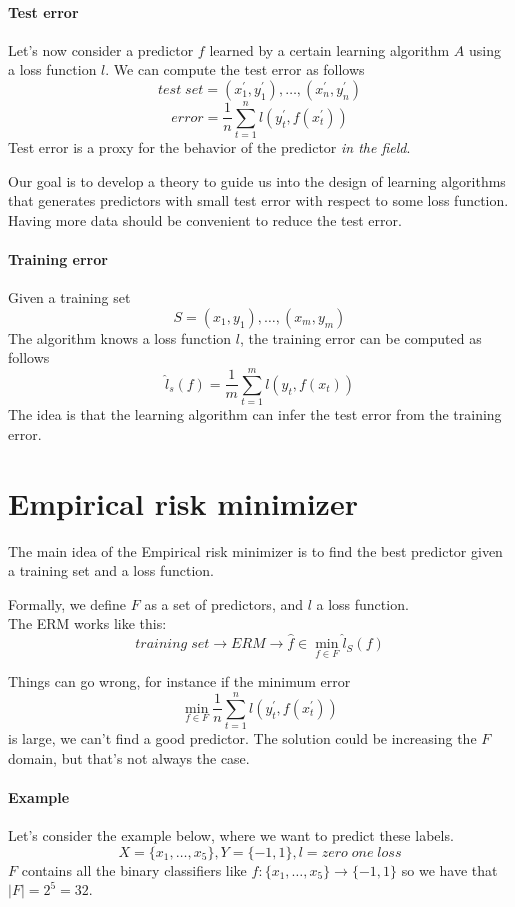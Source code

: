 \paragraph{Test error}
Let's now consider a predictor $f$ learned by a certain learning algorithm $A$ 
using a loss function $l$.
We can compute the test error as follows
$$\mathit{test\;set} = (x^\prime_1, y^\prime_1), \dots,(x^\prime_n, y^\prime_n)$$
$$\mathit{error} = \frac{1}{n}\sum_{t=1}^n l(y^\prime_t, f(x^\prime_t))$$
Test error is a proxy for the behavior of the predictor \emph{in the field}.

\begin{remark}
    Our goal is to develop a theory to guide us into the design of learning algorithms 
    that generates predictors with small test error with respect to some loss function.\\
    Having more data should be convenient to reduce the test error.
\end{remark}

\paragraph{Training error}
Given a training set
$$S = (x_1, y_1), \dots,(x_m, y_m)$$
The algorithm knows a loss function $l$, the training error can be computed as follows
$$\hat{l}_s(f) = \frac{1}{m}\sum_{t=1}^m l(y_t, f(x_t))$$
The idea is that the learning algorithm can infer the test error from the training error.

\section{Empirical risk minimizer}
\label{erm}
The main idea of the Empirical risk minimizer is to find the best predictor given 
a training set and a loss function.

Formally, we define $F$ as a set of predictors, and $l$ a loss function.\\
The ERM works like this:
$$\mathit{training\;set} \longrightarrow \mathit{ERM} \longrightarrow 
\hat{f} \in \min_{f \in F} \hat{l}_S(f)$$

Things can go wrong, for instance if the minimum error
$$\min_{f \in F} \frac{1}{n}\sum_{t = 1}^n l(y_t^\prime, f(x_t^\prime))$$
is large, we can't find a good predictor. The solution could be increasing the $F$ domain, 
but that's not always the case.

\paragraph{Example}
Let's consider the example below, where we want to predict these labels.
$$X = \{x_1, \dots, x_5\}, Y = \{-1,1\}, l = \mathit{zero\;one\;loss}$$
$F$ contains all the binary classifiers like
$f : \{x_1, \dots, x_5\} \longrightarrow \{-1,1\}$
so we have that $|F| = 2^5 = 32$. 

